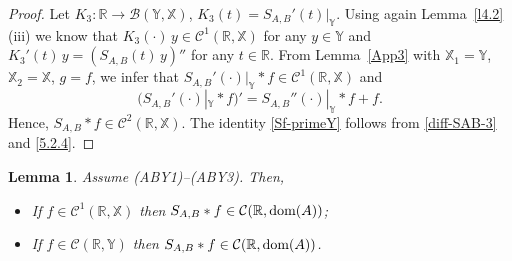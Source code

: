 \documentclass[11pt]{amsart}
\numberwithin{equation}{section}
\newtheorem{lemma}[theorem]{Lemma}
\theoremstyle{remark}
\theoremstyle{definition}
\newcommand\bX{{\mathbb X}}
\newcommand\bY{{\mathbb Y}}
\newcommand{\dom}{\text{\rm{dom}}}
\begin{document}
\begin{proof}
	Let $K_3: \mathbb{R} \to \mathcal{B}(\bY, \bX)$, $K_3(t) = S_{A,B}'(t)|_\bY$. Using again Lemma~\ref{l4.2}(iii) we know that $K_3(\cdot)\,y \in \mathcal{C}^1(\mathbb{R}, \bX)$ for any $y\in\bY$ and $K_3'(t)\,y = (S_{A,B}(t)\,y)''$ for any $t \in \mathbb{R}$. From Lemma~\ref{App3} with $\bX_1 = \bY$, $\bX_2 = \bX$, $g = f$, we infer that $S_{A,B}'(\cdot)|_\bY * f \in \mathcal{C}^1(\mathbb{R}, \bX)$ and 
	\begin{equation}\label{5.2.4} 
		(S_{A,B}'(\cdot)|_\bY * f)' = S_{A,B}''(\cdot)|_\bY * f + f.
	\end{equation}
	Hence, $S_{A,B} * f \in \mathcal{C}^2(\mathbb{R}, \bX)$.
	The identity \eqref{Sf-primeY} follows from \eqref{diff-SAB-3} and \eqref{5.2.4}.
\end{proof}

\begin{lemma}\label{l5.3} Assume \textnormal{(ABY1)--(ABY3)}. Then,
	\begin{itemize}
		\item[(i)] If $f \in \mathcal{C}^1(\mathbb{R}, \bX)$ then $S_{A,B} * f \in \mathcal{C}(\mathbb{R}, \dom(A))$;
		\item[(ii)] If $f \in \mathcal{C}(\mathbb{R}, \bY)$ then $S_{A,B} * f \in \mathcal{C}(\mathbb{R}, \dom(A))$.
	\end{itemize}	
\end{lemma}
\end{document}
